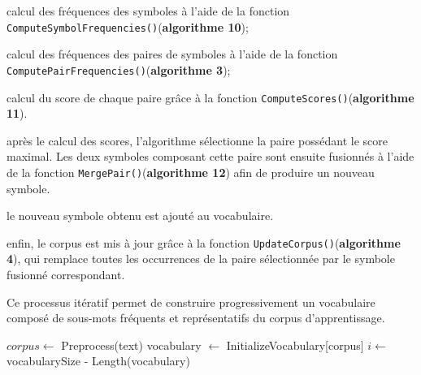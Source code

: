\documentclass[12pt,a4paper]{report}
\begin{document}
	\begin{itemizeFB}
		\item calcul des fréquences des symboles à l’aide de la fonction \texttt{ComputeSymbolFrequencies()}(\textbf{algorithme 10});
		\item calcul des fréquences des paires de symboles à l’aide de la fonction \texttt{ComputePairFrequencies()}(\textbf{algorithme 3});
		\item calcul du score de chaque paire grâce à la fonction \texttt{ComputeScores()}(\textbf{algorithme 11}).
		\item après le calcul des scores, l’algorithme sélectionne la paire possédant le score maximal. Les deux symboles composant cette paire sont ensuite fusionnés à l’aide de la fonction \texttt{MergePair()}(\textbf{algorithme 12}) afin de produire un nouveau symbole.
		\item le nouveau symbole obtenu est ajouté au vocabulaire. 
		\item enfin, le corpus est mis à jour grâce à la fonction \texttt{UpdateCorpus()}(\textbf{algorithme 4}), qui remplace toutes les occurrences de la paire sélectionnée par le symbole fusionné correspondant.
	\end{itemizeFB}

	Ce processus itératif permet de construire progressivement un vocabulaire composé de sous-mots fréquents et représentatifs du corpus d’apprentissage.
	
	\begin{algorithm}[H]
		\caption{TrainWordPiece}
		
		
		$corpus \leftarrow$ Preprocess(text)\;
		vocabulary $\leftarrow$ InitializeVocabulary[corpus]\;
		$i \leftarrow$ vocabularySize - Length(vocabulary)
		
		
		
		
	\end{algorithm}
	
\end{document}
